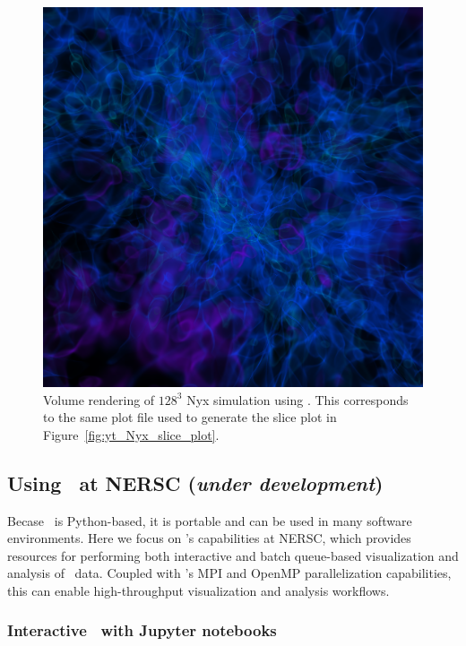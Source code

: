 \begin{figure}
  \includegraphics[scale=1.0]{./Visualization/yt_Nyx_density_vol_rend.png}
  \caption{Volume rendering of $128^3$ Nyx simulation using \yt. This
           corresponds to the same plot file used to generate the slice plot in
           Figure~\ref{fig:yt_Nyx_slice_plot}.}
  \label{fig:yt_Nyx_vol_rend}
\end{figure}

\subsection{Using \yt\ at NERSC (\emph{under development})}

Becase \yt\ is Python-based, it is portable and can be used in many software
environments. Here we focus on \yt's capabilities at NERSC, which provides
resources for performing both interactive and batch queue-based visualization
and analysis of \amrex\ data. Coupled with \yt's MPI and OpenMP parallelization
capabilities, this can enable high-throughput visualization and analysis
workflows.

\subsubsection{Interactive \yt\ with Jupyter notebooks}


